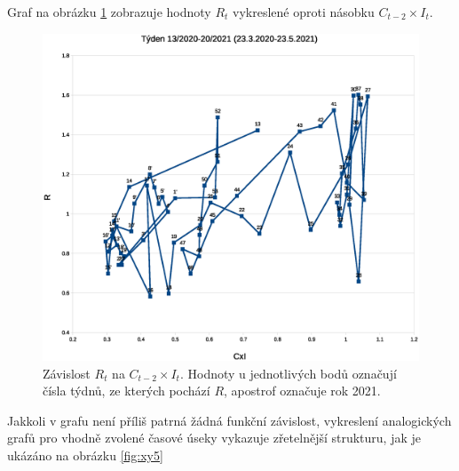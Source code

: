 Graf na obrázku \ref{fig:xy} zobrazuje hodnoty $R_{t}$ vykreslené oproti násobku
$C_{t-2}\times I_{t}$. 
\begin{figure}
\begin{center}
\includegraphics[scale=0.4]{pic/epi}
\caption{Závislost $R_t$ na $C_{t-2} \times I_t$. Hodnoty u jednotlivých bodů označují čísla týdnů, ze kterých pochází $R$, apostrof označuje rok 2021.}
\label{fig:xy}
\end{center}
\end{figure}
Jakkoli v grafu není příliš patrná žádná funkční závislost, vykreslení analogických grafů 
pro vhodně zvolené časové úseky vykazuje 
zřetelnější strukturu, jak je ukázáno na obrázku \ref{fig:xy5}
